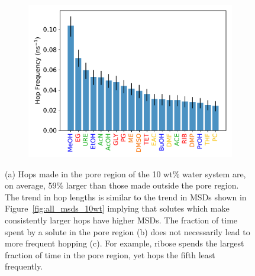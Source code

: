 \documentclass[journal=jpcbfk,manuscript=article]{achemso}
\begin{document}
\begin{figure}
\begin{subfigure}{0.325\textwidth}
  \includegraphics[width=\textwidth]{hopfreq_total.pdf}
  \caption{}\label{fig:hopfreq}
  \end{subfigure}
  \caption{(a) Hops made in the pore region of the 10 wt\% water system 
  are, on average, 59\% larger than those made outside the pore region. 
  The trend in hop lengths is similar to the trend in MSDs shown in 
  Figure~\ref{fig:all_msds_10wt} implying that solutes which make consistently 
  larger hops have higher MSDs. The fraction of time spent by a solute in the 
  pore region (b) does not necessarily lead to more frequent hopping (c). For
  example, ribose spends the largest fraction of time in the pore region, yet
  hops the fifth least frequently.}\label{fig:hops}
  \end{figure}
  
\end{document}
